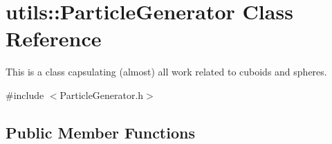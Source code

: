\hypertarget{classutils_1_1ParticleGenerator}{\section{utils\-:\-:Particle\-Generator Class Reference}
\label{classutils_1_1ParticleGenerator}
}


This is a class capsulating (almost) all work related to cuboids and spheres.  




{\ttfamily \#include $<$Particle\-Generator.\-h$>$}

\subsection*{Public Member Functions}
